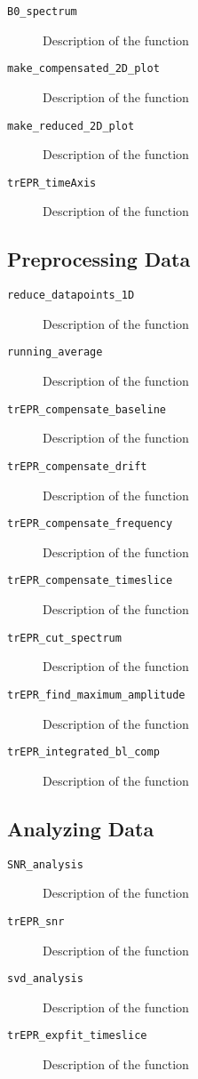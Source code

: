 \documentclass[a4paper]{refrep}
\begin{document}
\begin{description}
  \item[\texttt{B0\_spectrum}] Description of the function
  \item[\texttt{make\_compensated\_2D\_plot}] Description of the function
  \item[\texttt{make\_reduced\_2D\_plot}] Description of the function
  \item[\texttt{trEPR\_timeAxis}] Description of the function
\end{description}


\subsection{Preprocessing Data}

\begin{description}
  \item[\texttt{reduce\_datapoints\_1D}] Description of the function
  \item[\texttt{running\_average}] Description of the function
  \item[\texttt{trEPR\_compensate\_baseline}] Description of the function
  \item[\texttt{trEPR\_compensate\_drift}] Description of the function
  \item[\texttt{trEPR\_compensate\_frequency}] Description of the function
  \item[\texttt{trEPR\_compensate\_timeslice}] Description of the function
  \item[\texttt{trEPR\_cut\_spectrum}] Description of the function
  \item[\texttt{trEPR\_find\_maximum\_amplitude}] Description of the function
  \item[\texttt{trEPR\_integrated\_bl\_comp}] Description of the function
\end{description}


\subsection{Analyzing Data}

\begin{description}
  \item[\texttt{SNR\_analysis}] Description of the function
  \item[\texttt{trEPR\_snr}] Description of the function
  \item[\texttt{svd\_analysis}] Description of the function
  \item[\texttt{trEPR\_expfit\_timeslice}] Description of the function
\end{description}
\end{document}
